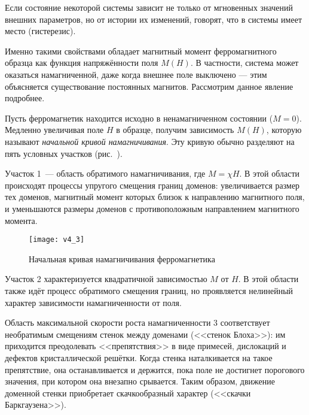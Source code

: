 
Если состояние некоторой системы зависит не только от мгновенных значений
внешних параметров, но от истории их изменений, говорят, что
в системы имеет место \important(гистерезис).

Именно такими свойствами обладает магнитный момент ферромагнитного образца
как функция напряжённости поля $M(H)$. В частности,
система может оказаться намагниченной, даже когда внешнее поле выключено ---
этим объясняется существование постоянных магнитов. Рассмотрим данное явление подробнее.

Пусть ферромагнетик находится исходно в ненамагниченном состоянии
($M = 0$). Медленно увеличивая поле $H$ в образце, получим зависимость
$M(H)$, которую называют \emph{начальной кривой намагничивания}. Эту кривую обычно
разделяют на пять условных участков (рис.~).

Участок 1~--- область обратимого намагничивания, где $M =\chi H$. В этой области
происходят процессы упругого смещения границ доменов: увеличивается размер тех
доменов, магнитный момент которых близок к направлению магнитного поля, и
уменьшаются размеры доменов с противоположным направлением магнитного момента.

\begin{wrapfigure}[]{r}{0.5\textwidth}
    \texttt{[image: v4\_3]}
    \caption{Начальная кривая намагничивания ферромагнетика}
\end{wrapfigure}

Участок 2 характеризуется квадратичной зависимостью $M$ от $H$. В этой области
также идёт процесс обратимого смещения границ, но проявляется нелинейный характер
зависимости намагниченности от поля.

Область максимальной скорости роста намагниченности 3 соответствует необратимым
смещениям стенок между доменами (<<стенок Блоха>>):
им приходится преодолевать <<препятствия>> в виде примесей,
дислокаций и дефектов кристаллической решётки.
Когда стенка наталкивается на такое препятствие, она останавливается и держится,
пока поле не достигнет порогового значения, при котором она внезапно
срывается. Таким образом, движение доменной стенки приобретает скачкообразный
характер (<<скачки Баркгаузена>>).


